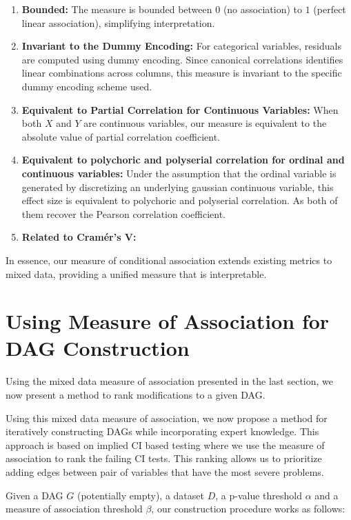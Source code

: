 \documentclass{uai2025} %
\begin{document}
\begin{enumerate}
	\item \textbf{Bounded: } The measure is bounded between $ 0 $ (no
		association) to $ 1 $ (perfect linear association), simplifying
		interpretation.
	\item \textbf{Invariant to the Dummy Encoding: } For categorical
		variables, residuals are computed using dummy encoding. Since
		canonical correlations identifies linear combinations across
		columns, this measure is invariant to the specific dummy
		encoding scheme used.
	\item \textbf{Equivalent to Partial Correlation for Continuous Variables: }
		When both $ X $ and $ Y $ are continuous variables, our measure
		is equivalent to the absolute value of partial correlation coefficient.
	\item \textbf{Equivalent to polychoric and polyserial correlation for
			ordinal and continuous variables: }
		Under the assumption that the ordinal variable is generated by
		discretizing an underlying gaussian continuous variable, this
		effect size is equivalent to polychoric and polyserial
		correlation. As both of them recover the Pearson correlation
		coefficient.
	\item \textbf{Related to Cram\'er's V: } 
\end{enumerate}

In essence, our measure of conditional association extends existing metrics to mixed data, providing 
a unified measure that is interpretable.

\section{Using Measure of Association for DAG Construction}
\label{sec:modification}

Using the mixed data measure of association presented in the last section, we 
now present a method to rank modifications to a given DAG.

Using this mixed data measure of association, we now propose a method for
iteratively constructing DAGs while incorporating expert knowledge. This
approach is based on implied CI based testing where we use the measure of
association to rank the failing CI tests. This ranking allows us to prioritize
adding edges between pair of variables that have the most severe problems.

Given a DAG $ G $ (potentially empty), a dataset $ D $, a p-value threshold $
\alpha $ and a measure of association threshold $ \beta $, our construction
procedure works as follows:
\end{document}

